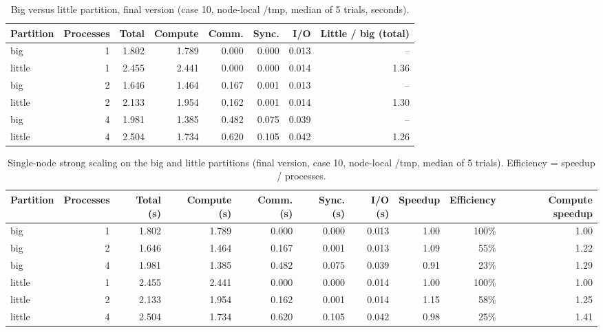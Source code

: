 \begin{table}[htbp]
\centering
\caption{Big versus little partition, final version (case 10, node-local /tmp, median of 5 trials, seconds).}
\label{tab:big-little}
\begin{tabular}{lrrrrrrr}
\toprule
Partition & Processes & Total & Compute & Comm. & Sync. & I/O & Little / big (total) \\
\midrule
big & 1 & 1.802 & 1.789 & 0.000 & 0.000 & 0.013 & -- \\
little & 1 & 2.455 & 2.441 & 0.000 & 0.000 & 0.014 & 1.36 \\
big & 2 & 1.646 & 1.464 & 0.167 & 0.001 & 0.013 & -- \\
little & 2 & 2.133 & 1.954 & 0.162 & 0.001 & 0.014 & 1.30 \\
big & 4 & 1.981 & 1.385 & 0.482 & 0.075 & 0.039 & -- \\
little & 4 & 2.504 & 1.734 & 0.620 & 0.105 & 0.042 & 1.26 \\
\bottomrule
\end{tabular}
\end{table}

\begin{table}[htbp]
\centering
\caption{Single-node strong scaling on the big and little partitions (final version, case 10, node-local /tmp, median of 5 trials). Efficiency = speedup / processes.}
\label{tab:scaling-big-little}
\begin{tabular}{lrrrrrrrrr}
\toprule
Partition & Processes & Total (s) & Compute (s) & Comm. (s) & Sync. (s) & I/O (s) & Speedup & Efficiency & Compute speedup \\
\midrule
big & 1 & 1.802 & 1.789 & 0.000 & 0.000 & 0.013 & 1.00 & 100\% & 1.00 \\
big & 2 & 1.646 & 1.464 & 0.167 & 0.001 & 0.013 & 1.09 & 55\% & 1.22 \\
big & 4 & 1.981 & 1.385 & 0.482 & 0.075 & 0.039 & 0.91 & 23\% & 1.29 \\
little & 1 & 2.455 & 2.441 & 0.000 & 0.000 & 0.014 & 1.00 & 100\% & 1.00 \\
little & 2 & 2.133 & 1.954 & 0.162 & 0.001 & 0.014 & 1.15 & 58\% & 1.25 \\
little & 4 & 2.504 & 1.734 & 0.620 & 0.105 & 0.042 & 0.98 & 25\% & 1.41 \\
\bottomrule
\end{tabular}
\end{table}

